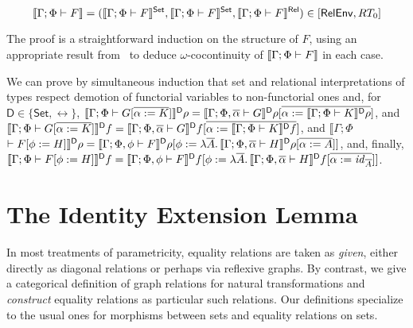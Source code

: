 \documentclass[runningheads]{llncs}
\newcommand{\set}{\mathsf{Set}}
\renewcommand{\id}{\mathit{id}}
\renewcommand{\id}{\mathit{id}}
\begin{document}
\vspace*{-0.2in}

\begin{equation}\label{lem:rel-transf-morph}
\sem{\Gamma;\Phi \vdash F} = (\setsem{\Gamma;\Phi \vdash F},
\setsem{\Gamma;\Phi \vdash F},\relsem{\Gamma;\Phi \vdash F}) \in
       [\relenv,RT_0]
\end{equation}

\vspace*{-0.05in}

\noindent
The proof is a straightforward induction on the structure of $F$,
using an appropriate result from~\cite{jp19} to deduce
$\omega$-cocontinuity of $\llbracket{\Gamma;\Phi \vdash F}\rrbracket$ in each case.


We can prove by simultaneous induction that set and relational
interpretations of types respect demotion of functorial variables to
non-functorial ones and, for $\mathsf D \in \{\set,\rel\}$,
$\llbracket{\Gamma;\Phi \vdash G[\overline{\alpha := K}]}\rrbracket^{\mathsf D}\rho =
\llbracket{\Gamma;\Phi,\overline{\alpha} \vdash G}\rrbracket^{\mathsf D}\rho[\overline{\alpha :=
    \llbracket{\Gamma;\Phi \vdash K}\rrbracket^{\mathsf D}\rho}]$, and
$\llbracket{\Gamma;\Phi \vdash G[\overline{\alpha := K}]}\rrbracket^{\mathsf D}f =
\llbracket{\Gamma;\Phi,\overline{\alpha} \vdash G}\rrbracket^{\mathsf D}f[\overline{\alpha :=
    \llbracket{\Gamma;\Phi \vdash K}\rrbracket^{\mathsf D}f}]$, and $\llbracket
\Gamma; \Phi$ $\vdash F[\phi := H] \rrbracket^{\mathsf D} \rho =
\llbracket{\Gamma; \Phi, \phi \vdash F}\rrbracket^{\mathsf D}\rho [\phi := \lambda
  \overline{A}.\, \llbracket{\Gamma;\Phi,\overline{\alpha}\vdash H}\rrbracket^{\mathsf
    D}\rho[\overline{\alpha := A}]]$, and, finally, $\sem{\Gamma; \Phi
  \vdash F[\phi := H]}^{\mathsf D}f = \sem{\Gamma; \Phi, \phi \vdash
  F}^{\mathsf D}f [\phi := \lambda
  \ol{A}.\,\sem{\Gamma;\Phi,\overline{\alpha}\vdash H}^{\mathsf
    D}f[\overline{\alpha := \id_{\ol{A}}}]]$.

\vspace*{-0.1in}

\section{The Identity Extension Lemma}\label{sec:iel}

\vspace*{-0.1in}

In most treatments of parametricity, equality relations are taken as
{\em given}, either directly as diagonal relations or perhaps via
reflexive graphs.  By contrast, we give a categorical definition of
graph relations for natural transformations and {\em construct}
equality relations as particular such relations. Our definitions
specialize to the usual ones for morphisms between sets and equality
relations on sets.
\end{document}
